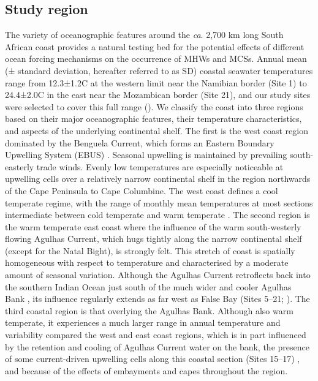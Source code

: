 \documentclass[a4paper,10pt,review]{elsarticle}
\begin{document}
\subsection{Study region}
The variety of oceanographic features around the \emph{ca}. 2,700 km long South African coast provides a natural testing bed for the potential effects of different ocean forcing mechanisms on the occurrence of MHWs and MCSs. Annual mean (± standard deviation, hereafter referred to as SD) coastal seawater temperatures range from 12.3±1.2\degree C at the western limit near the Namibian border (Site 1) to 24.4±2.0\degree C in the east near the Mozambican border (Site 21), and our study sites were selected to cover this full range (). We classify the coast into three regions based on their major oceanographic features, their temperature characteristics, and aspects of the underlying continental shelf. The first is the west coast region dominated by the Benguela Current, which forms an Eastern Boundary Upwelling System (EBUS) \citep{Hutchings2009}. Seasonal upwelling is maintained by prevailing south-easterly trade winds. Evenly low temperatures are especially noticeable at upwelling cells over a relatively narrow continental shelf in the region northwards of the Cape Peninsula to Cape Columbine. The west coast defines a cool temperate regime, with the range of monthly mean temperatures at most sections intermediate between cold temperate and warm temperate \citep{Luning1990}. The second region is the warm temperate \citep{Luning1990} east coast where the influence of the warm south-westerly flowing Agulhas Current, which hugs tightly along the narrow continental shelf (except for the Natal Bight), is strongly felt. This stretch of coast is spatially homogeneous with respect to temperature and characterised by a moderate amount of seasonal variation. Although the Agulhas Current retroflects back into the southern Indian Ocean \citep{Hutchings2009} just south of the much wider and cooler Agulhas Bank \citep{Roberts2005}, its influence regularly extends as far west as False Bay (Sites 5--21; ). The third coastal region is that overlying the Agulhas Bank. Although also warm temperate, it experiences a much larger range in annual temperature and variability compared the west and east coast regions, which is in part influenced by the retention and cooling of Agulhas Current water on the bank, the presence of some current-driven upwelling cells along this coastal section (Sites 15--17) \citep{Roberts2005}, and because of the effects of embayments and capes throughout the region.
\end{document}
